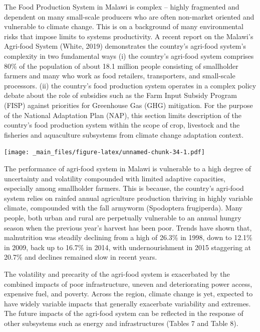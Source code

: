 \documentclass[
]{book}
\begin{document}
The Food Production System in Malawi is complex -- highly fragmented and dependent on many small-scale producers who are often non-market oriented and vulnerable to climate change. This is on a background of many environmental risks that impose limits to systems productivity. A recent report on the Malawi's Agri-food System (White, 2019) demonstrates the country's agri-food system's complexity in two fundamental ways (i) the country's agri-food system comprises 80\% of the population of about 18.1 million people consisting of smallholder farmers and many who work as food retailers, transporters, and small-scale processors. (ii) the country's food production system operates in a complex policy debate about the role of subsidies such as the Farm Input Subsidy Program (FISP) against priorities for Greenhouse Gas (GHG) mitigation. For the purpose of the National Adaptation Plan (NAP), this section limits description of the country's food production system within the scope of crop, livestock and the fisheries and aquaculture subsystems from climate change adaptation context.

\texttt{[image: \_main\_files/figure-latex/unnamed-chunk-34-1.pdf]}

The performance of agri-food system in Malawi is vulnerable to a high degree of uncertainty and volatility compounded with limited adaptive capacities, especially among smallholder farmers. This is because, the country's agri-food system relies on rainfed annual agriculture production thriving in highly variable climate, compounded with the fall armyworm (Spodoptera frugiperda). Many people, both urban and rural are perpetually vulnerable to an annual hungry season when the previous year's harvest has been poor. Trends have shown that, malnutrition was steadily declining from a high of 26.3\% in 1998, down to 12.1\% in 2009, back up to 16.7\% in 2014, with undernourishment in 2015 staggering at 20.7\% and declines remained slow in recent years.

The volatility and precarity of the agri-food system is exacerbated by the combined impacts of poor infrastructure, uneven and deteriorating power access, expensive fuel, and poverty. Across the region, climate change is yet, expected to have widely variable impacts that generally exacerbate variability and extremes. The future impacts of the agri-food system can be reflected in the response of other subsystems such as energy and infrastructures (Tables 7 and Table 8).

\providecommand{\docline}[3]{\noalign{\global\setlength{\arrayrulewidth}{#1}}\arrayrulecolor[HTML]{#2}\cline{#3}}
\end{document}
